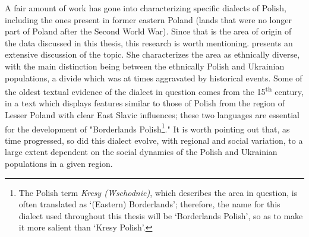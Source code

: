 A fair amount of work has gone into characterizing specific dialects of Polish, including the ones present in former eastern Poland (lands that were no longer part of Poland after the Second World War). Since that is the area of origin of the data discussed in this thesis, this research is worth mentioning. \citet{kurzowa_1983} presents an extensive discussion of the topic. She characterizes the area as ethnically diverse, with the main distinction being between the ethnically Polish and Ukrainian populations, a divide which was at times aggravated by historical events. Some of the oldest textual evidence of the dialect in question comes from the 15\textsuperscript{th} century, in a text which displays features similar to those of Polish from the region of Lesser Poland with clear East Slavic influences; these two languages are essential for the development of "Borderlands Polish\footnote{The Polish term \textit{Kresy (Wschodnie)}, which describes the area in question, is often translated as `(Eastern) Borderlands'; therefore, the name for this dialect used throughout this thesis will be `Borderlands Polish', so as to make it more salient than `Kresy Polish'.}." It is worth pointing out that, as time progressed, so did this dialect evolve, with regional and social variation, to a large extent dependent on the social dynamics of the Polish and Ukrainian populations in a given region. 

